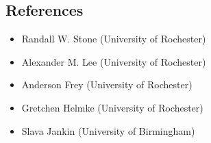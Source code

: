 \documentclass[margin,line,10.95pt]{res}
\begin{document}
\begin{resume}
\section{\sc References}
\begin{itemize}
	\item Randall W. Stone (University of Rochester)
	\item Alexander M. Lee (University of Rochester)
	\item Anderson Frey (University of Rochester)
	\item Gretchen Helmke (University of Rochester) 
	\item Slava Jankin (University of Birmingham)



	\end{itemize}



\thispagestyle{updated}

\end{resume}
\end{document}
